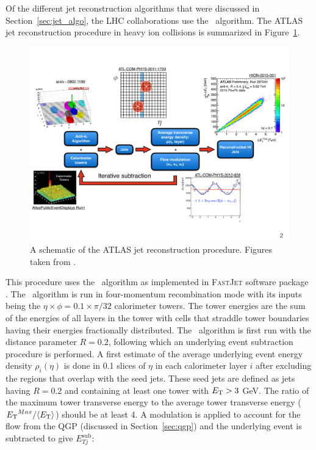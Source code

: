 Of the different jet reconstruction algorithms that were discussed in Section~\ref{sec:jet_algo}, the LHC collaborations use the \antikt\ algorithm.
The ATLAS jet reconstruction procedure in heavy ion collisions is summarized in Figure~\ref{fig:atlasHIjetreco}.

\begin{figure}[htbp!]
	\centering
	\includegraphics[width=\textwidth]{figures/setup/atlasHIjetReco} %
	\caption{A schematic of the ATLAS jet reconstruction procedure.
	Figures taken from \cite{Cacciari:2008gp, atlasRun1EventDisplay, ATLAS-COM-PHYS-2011-1733, Cole:1450219, perfPlots}.}	
	\label{fig:atlasHIjetreco}%
\end{figure}

This procedure uses the \antikt\ algorithm as implemented in \textsc{FastJet} software package \cite{fastjet_algo}.
The \antikt\ algorithm is run in four-momentum recombination mode with its inputs being the $\eta \times \phi = 0.1 \times \pi / 32$ calorimeter towers.
The tower energies are the sum of the energies of all layers in the tower with cells that straddle tower boundaries having their energies fractionally distributed.
The \antikt\ algorithm is first run with the distance parameter $R=0.2$, following which an underlying event subtraction procedure is performed.
A first estimate of the average underlying event energy density $\rho_i (\eta)$ is done in 0.1 slices of $\eta$ in each calorimeter layer $i$ after excluding the regions that overlap with the seed jets.
These seed jets are defined as jets having $R = 0.2$ and containing at least one tower with $\mbox{$E_{\mathrm{T}}$} > 3$ GeV.
The ratio of the maximum tower transverse energy to the average tower transverse energy ($\mbox{$E_{\mathrm{T}}$}^{Max} / \langle \mbox{$E_{\mathrm{T}}$} \rangle$) should be at least 4.
A modulation is applied to account for the flow from the QGP (discussed in Section~\ref{sec:qgp}) and the underlying event is subtracted to give $E_{Tj}^{\mathrm{sub}}$:

